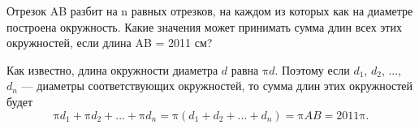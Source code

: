 

\begin{itemize}

\itB Отрезок AB разбит на n равных отрезков, на каждом из которых как на диаметре построена окружность. Какие значения может принимать сумма длин всех этих окружностей, если длина AB = 2011 см?

\itr Как известно, длина окружности диаметра $d$ равна $\text{π}d$. Поэтому если $d_1$, $d_2$, ..., $d_n$ --- диаметры соответствующих окружностей, то сумма длин этих окружностей будет
$$
\text{π} d_1+\text{π} d_2+...+\text{π} d_n=\text{π} (d_1+d_2+...+d_n)=\text{π} AB=2011\text{π}.
$$

\end{itemize}


